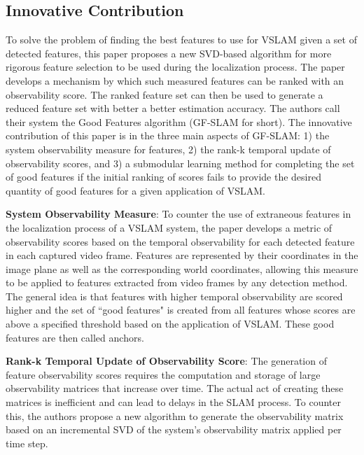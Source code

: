 \documentclass[10pt,twocolumn,letterpaper]{article}
\begin{document}
\subsection{Innovative Contribution}
To solve the problem of finding the best features to use for VSLAM given a set of detected features, 
this paper proposes a new SVD-based algorithm for more rigorous feature selection to be used 
during the localization process. The paper develops a mechanism by which such measured features 
can be ranked with an observability score. The ranked feature set can then be used to generate a 
reduced feature set with better a better estimation accuracy. The authors call their system the Good 
Features algorithm (GF-SLAM for short). The innovative contribution of this paper is in the three main 
aspects of GF-SLAM: 1) the system observability measure for features, 2) the rank-k temporal update 
of observability scores, and 3) a submodular learning method for completing the set of good features if 
the initial ranking of scores fails to provide the desired quantity of good features for a given application of 
VSLAM.

\textbf{System Observability Measure}: To counter the use of extraneous features in the localization process 
of a VSLAM system, the paper develops a metric of observability scores based on the temporal observability 
for each detected feature in each captured video frame. Features are represented by their coordinates in the 
image plane as well as the corresponding world coordinates, allowing this measure to be applied to features 
extracted from video frames by any detection method. The general idea is that features with higher temporal 
observability are scored higher and the set of ``good features" is created from all features whose scores are 
above a specified threshold based on the application of VSLAM. These good features are then called 
anchors.
%

\textbf{Rank-k Temporal Update of Observability Score}: The generation of feature observability 
scores requires 
the computation and storage of large observability matrices that increase over time. 
The actual act of creating these matrices is inefficient and can lead to delays 
in the SLAM process. To counter this, the authors propose a new algorithm to generate the 
observability matrix 
based on an incremental SVD of the system's observability matrix applied per time step.
\end{document}
